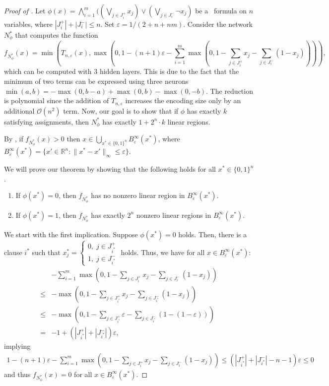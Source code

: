 \documentclass{article}
\begin{document}
\begin{proof}[Proof of ]
Let $\phi(x)=\bigwedge_{i=1}^m((\bigvee_{j\in J^+_i}x_j) \vee (\bigvee_{j\in J^-_i}\neg x_j) $ be a \SAT\ formula on $n$ variables, where $|J^+_i|+|J^-_i|\leq n$.
Set $\varepsilon = 1/(2+n+nm)$.
Consider the network $N_\phi^*$ that computes the function
\[
    f_{N_\phi^*}(x)=\min(T_{n,\varepsilon}(x), \max(0, 1-(n+1)\varepsilon-\sum_{i=1}^m \max(0, 1-\sum_{j\in J^+_i}x_j-\sum_{j\in J^-_i}(1-x_j)))),
\]
which can be computed with 3 hidden layers. This is due to the fact that the minimum of two terms can be expressed using three neurons $\min(a,b)=-\max(0,b-a)+\max(0,b)-\max(0,-b)$.
The reduction is polynomial since the addition of $T_{n,\varepsilon}$ increases the encoding size only by an additional $\mathcal{O}(n^2)$ term.
Now, our goal is to show that if $\phi$ has exactly $k$ satisfying assignments, then $N_\phi^*$ has exactly $1+2^n \cdot k$ linear regions.

By , if $f_{N_\phi^*}(x)> 0$ then $x\in \bigcup_{x^*\in \{0,1\}^n}B^\infty_\varepsilon(x^*)$, where $B^\infty_\varepsilon(x^*)=\{x'\in \mathbb{R}^n: \|x^*-x'\|_\infty \leq \varepsilon\}$.

We will prove our theorem by showing that the following holds for all $x^*\in \{0,1\}^n$.
\begin{enumerate}
    \item If $\phi(x^*)=0$, then $f_{N_\phi^*}$ has no nonzero linear region in $B^\infty_\varepsilon(x^*)$.
    \item If $\phi(x^*)=1$, then $f_{N_\phi^*}$ has exactly $2^n$ nonzero linear regions in $B^\infty_\varepsilon(x^*)$.
\end{enumerate}
We start with the first implication.
Suppose $\phi(x^*)=0$ holds.
Then, there is a clause $i^*$ such that
$x^*_j= \begin{cases}
    0,\; j\in J^+_{i^*}\\
    1,\;j\in J^-_{i^*}
\end{cases}$
holds.
Thus, we have for all $x\in B^\infty_\varepsilon(x^*)$:
\begin{align*}
&-\sum_{i=1}^m \max(0, 1-\sum_{j\in J^+_i}x_j-\sum_{j\in J^-_i}(1-x_j))\\
\leq &-\max(0,1-\sum_{j\in J^+_{i^*}}x_j-\sum_{j\in J^-_{i^*}}(1-x_j))\\
\leq &-\max(0,1-\sum_{j\in J^+_{i^*}}\varepsilon-\sum_{j\in J^-_{i^*}}(1-(1-\varepsilon)))\\
=&-1+(|J^+_{i^*}|+|J^-_{i^*}|) \varepsilon,
\end{align*}
implying
\begin{align*}
1-(n+1)\varepsilon-\sum_{i=1}^m \max(0, 1-\sum_{j\in J^+_i}x_j-\sum_{j\in J^-_i}(1-x_j))
\leq (|J^+_{i^*}|+|J^-_{i^*}|-n-1)\varepsilon
\leq 0
\end{align*}
and thus $f_{N_\phi^*}(x)=0$ for all $x\in B^\infty_\varepsilon(x^*)$.


\end{proof}
\end{document}
